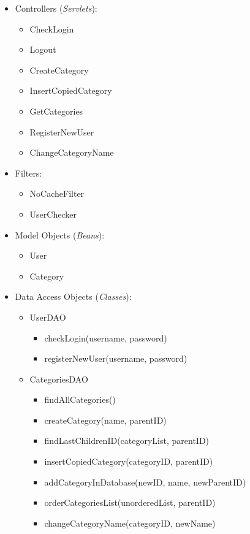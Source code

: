 \begin{itemize}
\tightlist
\item
  Controllers (\emph{Servlets}):

  \begin{itemize}
  \tightlist
  \item
    CheckLogin
  \item
    Logout
  \item
    CreateCategory
  \item
    InsertCopiedCategory
  \item
    GetCategories
  \item
    RegisterNewUser
  \item
    ChangeCategoryName
  \end{itemize}
\item
  Filters:

  \begin{itemize}
  \tightlist
  \item
    NoCacheFilter
  \item
    UserChecker
  \end{itemize}
\item
  Model Objects (\emph{Beans}):

  \begin{itemize}
  \tightlist
  \item
    User
  \item
    Category
  \end{itemize}
\item
  Data Access Objects (\emph{Classes}):

  \begin{itemize}
  \tightlist
  \item
    UserDAO

    \begin{itemize}
    \tightlist
    \item
      checkLogin(username, password)
    \item
      registerNewUser(username, password)
    \end{itemize}
  \item
    CategoriesDAO

    \begin{itemize}
    \tightlist
    \item
      findAllCategories()
    \item
      createCategory(name, parentID)
    \item
      findLastChildrenID(categoryList, parentID)
    \item
      insertCopiedCategory(categoryID, parentID)
    \item
      addCategoryInDatabase(newID, name, newParentID)
    \item
      orderCategoriesList(unorderedList, parentID)
    \item
      changeCategoryName(categoryID, newName)
    \end{itemize}
  \end{itemize}
\end{itemize}

